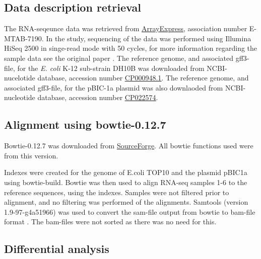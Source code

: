 \subsection{Data description retrieval}

The RNA-seqeunce data was retrieved from \href{https://www.ebi.ac.uk/arrayexpress/}{\color{MidnightBlue} \underline{ArrayExpress}}, association number E-MTAB-7190. In the study, sequencing of the data was performed using Illumina HiSeq 2500 in singe-read mode with 50 cycles, for more information regarding the sample data see the original paper \cite{jousset2018transcriptional}. The reference genome, and associated gff3-file, for the \textit{E. coli}  K-12 sub-strain DH10B was downloaded from NCBI-nucelotide database, accession number \href{https://www.ncbi.nlm.nih.gov/nuccore/CP000948.1}{\color{MidnightBlue} \underline{CP000948.1}}. The reference genome, and associated gff3-file, for the pBIC-1a plasmid was also downlaoded from NCBI-nucleotide database, accession number \href{https://www.ncbi.nlm.nih.gov/nuccore/CP022574}{\color{MidnightBlue} \underline{CP022574}}. 


\subsection{Alignment using bowtie-0.12.7}

Bowtie-0.12.7 \cite{langmead2009} was downloaded from \href{https://sourceforge.net/projects/bowtie-bio/}{\color{MidnightBlue} \underline{SourceForge}}. All bowtie functions used were from this version.

 Indexes were created for the genome of E.coli TOP10 and the 
 plasmid pBIC1a using bowtie-build. Bowtie was then used to align RNA-seq samples 1-6 to the reference sequences, using the indexes. Samples were not filtered prior to alignment, and no filtering was performed of the alignments. Samtools (version 1.9-97-g4a51966) was used to convert the sam-file output from bowtie to bam-file format \cite{li2009sequence_sam_tools}. The bam-files were not sorted as there was no need for this.    
 
\subsection{Differential analysis}

